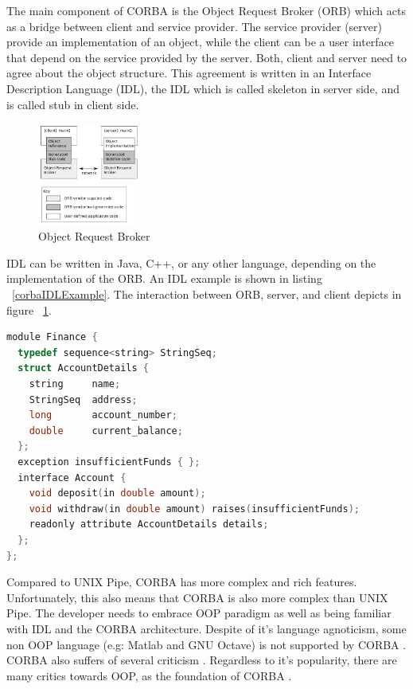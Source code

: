 \documentclass[conference]{IEEEtran}
\begin{document}
The main component of CORBA is the Object Request Broker (ORB) which acts as a bridge 
between client and service provider. The service provider (server) provide an 
implementation of an object, while the client can be a user interface that depend on
the service provided by the server. Both, client and server need to agree about the
object structure. This agreement is written in an Interface Description Language (IDL),
the IDL which is called skeleton in server side, and is called stub in client side.

\begin{figure}
	\centering
	\includegraphics[width=0.3\textwidth]
		{images/Orb.jpg}
	\caption{Object Request Broker}
	\label{fig:orb}
\end{figure}

IDL can be written in Java, C++, or any other language, depending on the implementation of
the ORB. An IDL example is shown in listing ~\ref{corbaIDLExample}. 
The interaction between ORB, server, and client depicts in figure ~\ref{fig:orb}.
 
\begin{lstlisting}[caption=CORBA IDL Example in C++, label=corbaIDLExample, language=c, basicstyle=\small, breaklines=true]
module Finance {
  typedef sequence<string> StringSeq;
  struct AccountDetails {
    string     name;
    StringSeq  address;
    long       account_number;
    double     current_balance;
  };
  exception insufficientFunds { };
  interface Account {
    void deposit(in double amount);
    void withdraw(in double amount) raises(insufficientFunds);
    readonly attribute AccountDetails details;
  };
};
\end{lstlisting}

Compared to UNIX Pipe, CORBA has more complex and rich features. Unfortunately, this also means 
that CORBA is also more complex than UNIX Pipe. The developer needs to embrace OOP 
paradigm as well as being familiar with IDL and the CORBA architecture. 
Despite of it's language agnoticism, some non OOP language (e.g: Matlab and GNU Octave) 
is not supported by CORBA \cite{feilhauer2016def}. CORBA also suffers of several 
criticism \cite{henning2006rise}. Regardless to it's popularity, there are many critics towards OOP, 
as the foundation of CORBA \cite{hadar2013intuition}.
\end{document}
